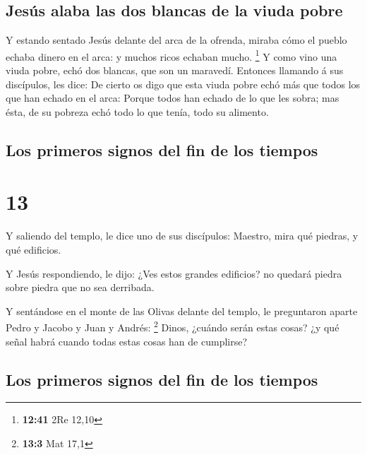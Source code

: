 \hypertarget{jesuxfas-alaba-las-dos-blancas-de-la-viuda-pobre}{%
\subsection{Jesús alaba las dos blancas de la viuda
pobre}\label{jesuxfas-alaba-las-dos-blancas-de-la-viuda-pobre}}

 Y estando sentado Jesús delante del arca de la ofrenda,
miraba cómo el pueblo echaba dinero en el arca: y muchos ricos echaban
mucho. \footnote{\textbf{12:41} 2Re 12,10}  Y como vino
una viuda pobre, echó dos blancas, que son un maravedí. 
Entonces llamando á sus discípulos, les dice: De cierto os digo que esta
viuda pobre echó más que todos los que han echado en el arca:
 Porque todos han echado de lo que les sobra; mas ésta,
de su pobreza echó todo lo que tenía, todo su alimento.

\hypertarget{los-primeros-signos-del-fin-de-los-tiempos}{%
\subsection{Los primeros signos del fin de los
tiempos}\label{los-primeros-signos-del-fin-de-los-tiempos}}

\hypertarget{section-12}{%
\section{13}\label{section-12}}

 Y saliendo del templo, le dice uno de sus discípulos:
Maestro, mira qué piedras, y qué edificios.

 Y Jesús respondiendo, le dijo: ¿Ves estos grandes
edificios? no quedará piedra sobre piedra que no sea derribada.

 Y sentándose en el monte de las Olivas delante del
templo, le preguntaron aparte Pedro y Jacobo y Juan y Andrés:
\footnote{\textbf{13:3} Mat 17,1}  Dinos, ¿cuándo serán
estas cosas? ¿y qué señal habrá cuando todas estas cosas han de
cumplirse?

\hypertarget{los-primeros-signos-del-fin-de-los-tiempos-1}{%
\subsection{Los primeros signos del fin de los
tiempos}\label{los-primeros-signos-del-fin-de-los-tiempos-1}}

